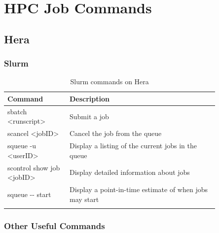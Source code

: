 \documentclass[11pt,fleqn]{report}              %
\begin{document}
\begin{enumerate}
\begin{itemize}
   \end{itemize}

\end{enumerate}




\chapter{HPC Job Commands}

\section{Hera}

\subsection{Slurm}
{
\fontsize{10}{12}\selectfont
\begin{longtable}{ p{0.25\linewidth} | p{0.6\linewidth} }
\hline
\hline
Command & Description \\
\hline
 sbatch <runscript> & Submit a job  \\
 scancel <jobID> & Cancel the job from the queue \\
 squeue -u <userID> & Display a listing of the current jobs in the queue \\
 scontrol show job <jobID> & Display detailed information about jobs \\
 squeue -{}- start & Display a point-in-time estimate of when jobs may start \\
\hline
\caption{Slurm commands on Hera}
\label{table:command_slurm_hera}
\end{longtable}
}

\subsection{Other Useful Commands}
\end{document}
